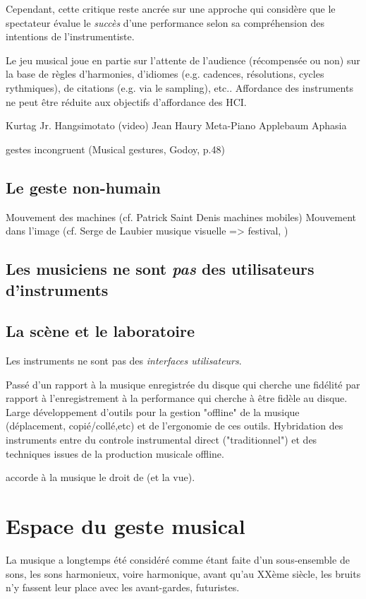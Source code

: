 Cependant, cette critique reste ancrée sur une approche qui considère que le spectateur évalue le \textit{succès} d'une performance selon sa compréhension des intentions de l'instrumentiste.


Le jeu musical joue en partie sur l’attente de l’audience (récompensée ou non) sur la base de règles d'harmonies, d’idiomes (e.g. cadences, résolutions, cycles rythmiques), de citations (e.g. via le sampling), etc..
Affordance des instruments ne peut être réduite aux objectifs d’affordance des HCI.


Kurtag Jr. Hangsimotato (video)
Jean Haury Meta-Piano
Applebaum Aphasia

gestes incongruent (Musical gestures, Godoy, p.48)

\subsection{Le geste non-humain}
Mouvement des machines (cf. Patrick Saint Denis machines mobiles)
Mouvement dans l'image (cf. Serge de Laubier musique visuelle => festival, )

\subsection{Les musiciens ne sont \emph{pas} des utilisateurs d'instruments}
\subsection{La scène et le laboratoire}

Les instruments ne sont pas des \textit{interfaces utilisateurs}.

Passé d'un rapport à la musique enregistrée du disque qui cherche une fidélité par rapport à l'enregistrement à la performance qui cherche à être fidèle au disque. \cite{??} 
Large développement d'outils pour la gestion "offline" de la musique (déplacement, copié/collé,etc) et de l'ergonomie de ces outils.
Hybridation des instruments entre du controle instrumental direct ("traditionnel") et des techniques issues de la production musicale offline.


accorde à la musique le droit de  (et la vue).


\section{Espace du geste musical}
La musique a longtemps été considéré comme étant faite d'un sous-ensemble de sons, les sons harmonieux, voire harmonique, avant qu'au XXème siècle, les bruits n'y fassent leur place avec les avant-gardes, futuristes. 

